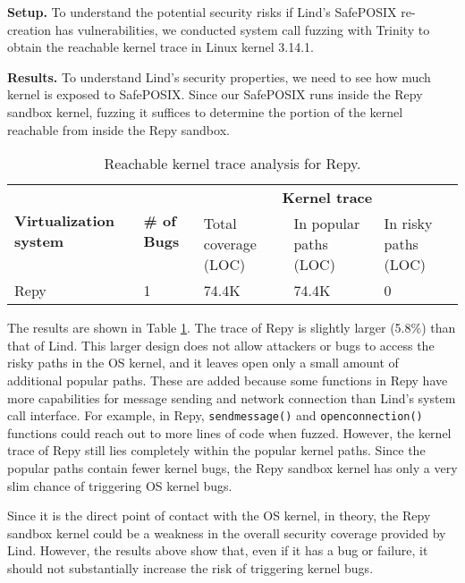 {{{\noindent
\textbf{Setup.}
To understand the potential security risks if Lind's SafePOSIX re-creation
has vulnerabilities, we conducted system call fuzzing with Trinity
to obtain the reachable kernel trace in Linux kernel 3.14.1.

\noindent
\textbf{Results.}
 To understand Lind's security properties, we need to see how much kernel is exposed to
SafePOSIX. Since our SafePOSIX runs inside the Repy sandbox kernel,
fuzzing it suffices to determine the portion of the kernel reachable from
inside the Repy sandbox.

\begin{table}
\centering
\scriptsize
\begin{tabular}{|l|l|l|l|l|}
  \hline
  \multirow{3}{1.5cm}{\bf Virtualization system} & \multirow{3}{0.5cm}{\bf \# of Bugs} & \multicolumn{3}{c|}{\bf Kernel trace} \\ \cline{3-5}
  & & \multirow{2}{1.5cm}{Total coverage (LOC)} & \multirow{2}{1.3cm}{In popular paths (LOC)} & \multirow{2}{1.3cm}{In risky paths (LOC)}  \\
  & & & & \\  \hline
  Repy & 1 & 74.4K & 74.4K & 0 \\
  \hline
\end{tabular}\caption{\small Reachable kernel trace analysis for Repy.}
\label{table:trace-Repy}
\end{table}

The results are shown in Table \ref{table:trace-Repy}.
The trace of Repy is slightly larger (5.8\%) than that of Lind.
This larger design does not allow attackers or bugs to
access the risky paths in the OS kernel, and it leaves open only a small amount of
additional popular paths. These are added because some functions in Repy
have more capabilities for message sending and network connection than Lind's
system call interface.
For example, in Repy,
\texttt{sendmessage()} and \texttt{openconnection()}
functions could reach out to more lines of code when fuzzed. However, the kernel
trace of Repy still lies completely within the popular kernel paths.
Since the popular paths contain fewer kernel bugs, the Repy sandbox kernel
has only a very slim chance of triggering OS kernel bugs.

Since it is the direct point of contact with the OS kernel, in theory, the Repy
 sandbox kernel could be a weakness in the overall security coverage provided by Lind.
However, the results above show that, even if it has a
bug or failure, it should not substantially increase the risk of triggering
kernel bugs.

}}}
